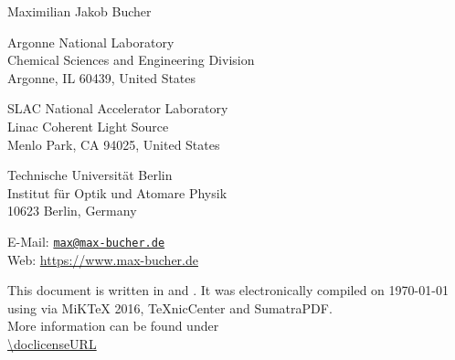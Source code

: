 \begin{flushleft}
{\Large Maximilian Jakob Bucher}\\
\footnotesize{Argonne National Laboratory\\
Chemical Sciences and Engineering Division\\
Argonne, IL 60439, United States\\
\vspace{0.5cm}

SLAC National Accelerator Laboratory\\
Linac Coherent Light Source\\
Menlo Park, CA 94025, United States
\vspace{0.5cm}

Technische Universit{\"a}t Berlin\\
Institut f{\"u}r Optik und Atomare Physik\\
10623 Berlin, Germany
\vspace{0.5cm}

E-Mail: \href{mailto:max@max-bucher.de}{\nolinkurl{max@max-bucher.de} }\\
Web: \url{https://www.max-bucher.de}}
\end{flushleft}
%
%
%
\vspace{7.5cm}
\footnotesize{This document is written in  and . It was electronically compiled on {\isodate\today} using  via MiKTeX 2016, TeXnicCenter and SumatraPDF.}\\
%
\null \vspace{1cm}
%
\normalsize{\doclicenseThis
More information can be found under\\
\url{\doclicenseURL}}
